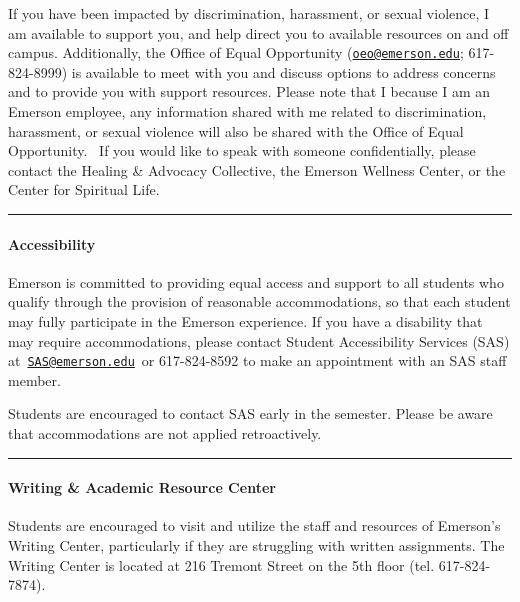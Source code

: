 \documentclass[
  letterpaper,
  DIV=11,
  numbers=noendperiod]{scrartcl}
\let\oldparagraph\paragraph
\renewcommand{\paragraph}[1]{\oldparagraph{#1}\mbox{}}
\begin{document}
If you have been impacted by discrimination, harassment, or sexual
violence, I am available to support you, and help direct you to
available resources on and off campus. Additionally, the Office of Equal
Opportunity (\href{mailto:oeo@emerson.edu}{\nolinkurl{oeo@emerson.edu}};
617-824-8999) is available to meet with you and discuss options to
address concerns and to provide you with support resources. Please note
that I because I am an Emerson employee, any information shared with me
related to discrimination, harassment, or sexual violence will also be
shared with the Office of Equal Opportunity. ~If you would like to speak
with someone confidentially, please contact the Healing \& Advocacy
Collective, the Emerson Wellness Center, or the Center for Spiritual
Life.

\begin{center}\rule{0.5\linewidth}{0.5pt}\end{center}

\hypertarget{accessibility}{%
\paragraph{Accessibility}\label{accessibility}}

Emerson is committed to providing equal access and support to all
students who qualify through the provision of reasonable accommodations,
so that each student may fully participate in the Emerson experience. If
you have a disability that may require accommodations, please contact
Student Accessibility Services (SAS)
at~\href{mailto:SAS@emerson.edu}{\nolinkurl{SAS@emerson.edu}}~or
617-824-8592 to make an appointment with an SAS staff member.

Students are encouraged to contact SAS early in the semester. Please be
aware that accommodations are not applied retroactively.

\begin{center}\rule{0.5\linewidth}{0.5pt}\end{center}

\hypertarget{writing-academic-resource-center}{%
\paragraph{Writing \& Academic Resource
Center}\label{writing-academic-resource-center}}

Students are encouraged to visit and utilize the staff and resources of
Emerson's Writing Center, particularly if they are struggling with
written assignments. The Writing Center is located at 216 Tremont Street
on the 5th floor (tel. 617-824-7874).
\end{document}
